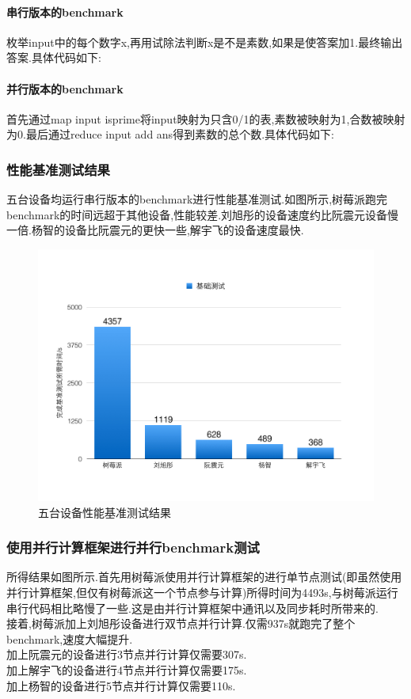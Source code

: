 \documentclass[paper=a4]{ctexart} %
\numberwithin{equation}{section} %
\numberwithin{figure}{section} %
\numberwithin{table}{section} %
\newcommand{\n}{\\\indent}
\begin{document}
\paragraph{串行版本的benchmark}
枚举input中的每个数字x,再用试除法判断x是不是素数,如果是使答案加1.最终输出答案.具体代码如下:


\paragraph{并行版本的benchmark}
首先通过map input isprime将input映射为只含0/1的表,素数被映射为1,合数被映射为0.最后通过reduce input add ans得到素数的总个数.具体代码如下: 


\subsubsection{性能基准测试结果}
五台设备均运行串行版本的benchmark进行性能基准测试.如图所示,树莓派跑完benchmark的时间远超于其他设备,性能较差.刘旭彤的设备速度约比阮震元设备慢一倍.杨智的设备比阮震元的更快一些,解宇飞的设备速度最快.

\begin{figure}[h*]
\centering
\includegraphics[width=\textwidth]{pic/graph001.jpg}
\caption{五台设备性能基准测试结果}
\end{figure}

\subsubsection{使用并行计算框架进行并行benchmark测试}
所得结果如图所示.首先用树莓派使用并行计算框架的进行单节点测试(即虽然使用并行计算框架,但仅有树莓派这一个节点参与计算)所得时间为4493s,与树莓派运行串行代码相比略慢了一些.这是由并行计算框架中通讯以及同步耗时所带来的.\n
接着,树莓派加上刘旭彤设备进行双节点并行计算.仅需937s就跑完了整个benchmark,速度大幅提升.\n
加上阮震元的设备进行3节点并行计算仅需要307s.\n
加上解宇飞的设备进行4节点并行计算仅需要175s.\n
加上杨智的设备进行5节点并行计算仅需要110s.\n
\end{document}
